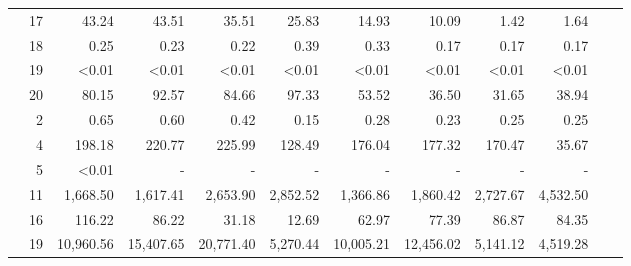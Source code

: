 \begin{table}
{\begin{tabular}{crrrrrrrrrrr}
& 17 & 43.24 & 43.51 & 35.51 & 25.83 & 14.93 & 10.09 & 1.42 & 1.64 \\ 
& 18 & 0.25 & 0.23 & 0.22 & 0.39 & 0.33 & 0.17 & 0.17 & 0.17 \\ 
& 19 & <0.01 & <0.01 & <0.01 & <0.01 & <0.01 & <0.01 & <0.01 & <0.01 \\ 
& 20 & 80.15 & 92.57 & 84.66 & 97.33 & 53.52 & 36.50 & 31.65 & 38.94 \\ 
\noalign{\medskip}
\parbox[t]{2mm}{} &
2 & 0.65 & 0.60 & 0.42 & 0.15 & 0.28 & 0.23 & 0.25 & 0.25 \\
& 4 & 198.18 & 220.77 & 225.99 & 128.49 & 176.04 & 177.32 & 170.47 & 35.67 \\
& 5 & <0.01 & - & - & - & - & - & - & - \\
& 11 & 1,668.50 & 1,617.41 & 2,653.90 & 2,852.52 & 1,366.86 & 1,860.42 & 2,727.67 & 4,532.50 \\
& 16 & 116.22 & 86.22 & 31.18 & 12.69 & 62.97 & 77.39 & 86.87 & 84.35 \\
& 19 & 10,960.56 & 15,407.65 & 20,771.40 & 5,270.44 & 10,005.21 & 12,456.02 & 5,141.12 & 4,519.28 \\
\hline
\end{tabular}
}
\end{table} 

\begin{table}
\caption{Class II experiments in road maps, runtimes in seconds of \lexgote \ for the experiments over Vermont and NY city maps.}
\label{tab:7-19}
\centering
{}
\end{table} 

